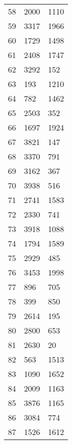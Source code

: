 \begin{longtable}[c]{ p{} p{} p{} }
	58          & 2000          & 1110         \\
	59          & 3317          & 1966         \\
	60          & 1729          & 1498         \\
	61          & 2408          & 1747         \\
	62          & 3292          & 152          \\
	63          & 193           & 1210         \\
	64          & 782           & 1462         \\
	65          & 2503          & 352          \\
	66          & 1697          & 1924         \\
	67          & 3821          & 147          \\
	68          & 3370          & 791          \\
	69          & 3162          & 367          \\
	70          & 3938          & 516          \\
	71          & 2741          & 1583         \\
	72          & 2330          & 741          \\
	73          & 3918          & 1088         \\
	74          & 1794          & 1589         \\
	75          & 2929          & 485          \\
	76          & 3453          & 1998         \\
	77          & 896           & 705          \\
	78          & 399           & 850          \\
	79          & 2614          & 195          \\
	80          & 2800          & 653          \\
	81          & 2630          & 20           \\
	82          & 563           & 1513         \\
	83          & 1090          & 1652         \\
	84          & 2009          & 1163         \\
	85          & 3876          & 1165         \\
	86          & 3084          & 774          \\
	87          & 1526          & 1612         \\

\end{longtable}
